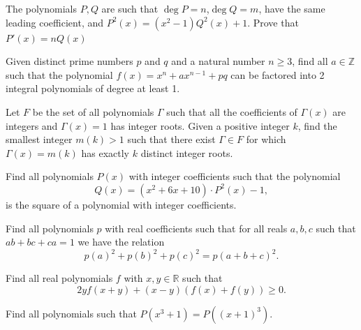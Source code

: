 \documentclass[12pt,a4paper]{memoir}
\theoremstyle{definition}
\begin{document}
\begin{question}
	The polynomials $P,Q$ are such that $\deg P=n$,$\deg Q=m$, have the same leading coefficient, and $P^2(x)=(x^2-1)Q^2(x)+1$. Prove that $P'(x)=nQ(x)$
\end{question}





\begin{question}
	Given distinct prime numbers $p$ and $q$ and a natural number $n \geq 3$, find all $a \in \mathbb{Z}$ such that the polynomial $f(x) = x^n + ax^{n-1} + pq$ can be factored into 2 integral polynomials of degree at least 1.
\end{question}





\begin{question}
	Let $F$ be the set of all polynomials $\Gamma$ such that all the coefficients of $\Gamma (x)$ are integers and $\Gamma (x) = 1$ has integer roots. Given a positive integer $k$, find the smallest integer $m(k) > 1$ such that there exist $\Gamma \in F$ for which $\Gamma (x) = m(k)$ has exactly $k$ distinct integer roots.
\end{question}





\begin{question}
	Find all polynomials $P(x)$ with integer coefficients such that the polynomial \[ Q(x)=(x^2+6x+10) \cdot P^2(x)-1, \] is the square of a polynomial with integer coefficients.
\end{question}





\begin{question}
	Find all polynomials $p$ with real coefficients such that for all reals $a, b ,c$ such that $ab+bc+ca =1$ we have the relation \[p(a)^{2}+p(b)^{2}+p(c)^{2}=p(a+b+c)^{2}.\]
\end{question}





\begin{question}
	Find all real polynomials $ f$ with $ x,y \in \mathbb{R}$ such that
	\[ 2 y f(x + y) + (x - y)(f(x) + f(y)) \geq 0.\]
\end{question}





\begin{question}
	Find all polynomials such that $P(x^3+1) = P((x+1)^3)$.
\end{question}
\end{document}
